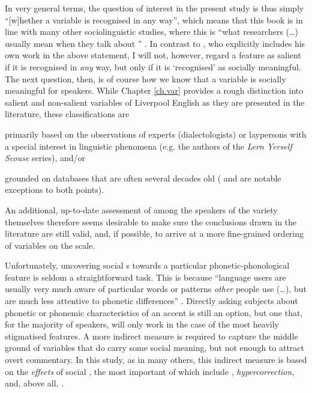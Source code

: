 In very general terms, the question of interest in the present study is thus simply ``[w]hether a variable is recognised in any way'', which means that this book is in line with many other sociolinguistic studies, where this is ``what researchers (\dots) usually mean when they talk about \emph{}'' \parencite[4, emphasis in original]{racz2013}.
In contrast to \textcite{racz2013}, who explicitly includes his own work in the above statement, I will not, however, regard a feature as salient if it is recognised in \emph{any} way, but only if it is `recognised' as socially meaningful.
The next question, then, is of course how we know that a variable is socially meaningful for speakers.
While Chapter \ref{ch.var} provides a rough distinction into salient and non-salient variables of Liverpool English as they are presented in the literature, these classifications are
\begin{inparaenum}[(1)]
	\item primarily based on the observations of experts (dialectologists) or laypersons with a special interest in linguistic phenomena (e.g. the authors of the \emph{Lern Yerself Scouse} series), and/or
	\item grounded on databases that are often several decades old (\citealt{watsonclark2013} and \citealt{watsonclark2015} are notable exceptions to both points).
\end{inparaenum}
An additional, up-to-date assessment of  among the speakers of the variety themselves therefore seems desirable to make sure the conclusions drawn in the literature are still valid, and, if possible, to arrive at a more fine-grained ordering of variables on the  scale.

Unfortunately, uncovering social s towards a particular phonetic-pho\-nol\-o\-gical feature is seldom a straightforward task.
This is because ``language users are usually very much aware of particular words or  patterns \emph{other} people use (\ldots), but are much less attentive to phonetic differences'' \parencite[3, emphasis in the original]{racz2013}.
Directly asking subjects about phonetic or phonemic characteristics of an accent is still an option, but one that, for the majority of speakers, will only work in the case of the most heavily stigmatised features.
A more indirect measure is required to capture the middle ground of variables that do carry some social meaning, but not enough to attract overt commentary.
In this study, as in many others, this indirect measure is based on the \emph{effects} of social , the most important of which include \emph{}, \emph{hypercorrection}, and, above all, \emph{}.

